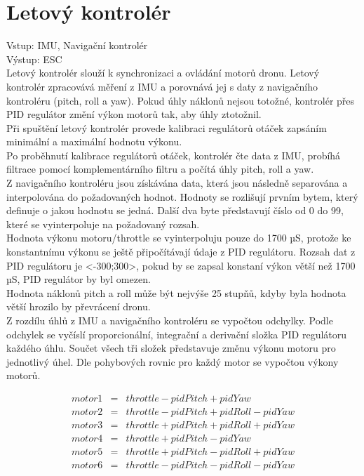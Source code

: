 \section{Letový kontrolér} 
Vstup: IMU, Navigační kontrolér\\
Výstup: ESC\\

Letový kontrolér slouží k synchronizaci a ovládání motorů dronu. Letový kontrolér zpracovává měření z IMU a porovnává jej s daty z navigačního kontroléru (pitch, roll a yaw). Pokud úhly náklonů nejsou totožné, kontrolér přes PID regulátor změní výkon motorů tak, aby úhly ztotožnil.\\
Při spuštění letový kontrolér provede kalibraci regulátorů otáček zapsáním minimální a maximální hodnotu výkonu.\\
Po proběhnutí kalibrace regulátorů otáček, kontrolér čte data z IMU, probíhá filtrace pomocí komplementárního filtru a počítá úhly pitch, roll a yaw.\\
Z navigačního kontroléru jsou získávána data, která jsou následně separována a interpolována do požadovaných hodnot. Hodnoty se rozlišují prvním bytem, který definuje o jakou hodnotu se jedná. Další dva byte představují číslo od 0 do 99, které se vyinterpoluje na požadovaný rozsah.\\
Hodnota výkonu motoru/throttle se vyinterpoluju pouze do 1700 µS, protože ke konstantnímu výkonu se ještě připočítávají údaje z PID regulátoru. Rozsah dat z PID regulátoru je <-300;300>, pokud by se zapsal konstaní výkon větší než 1700 µS, PID regulátor by byl omezen.\\
Hodnota náklonů pitch a roll  může být nejvýše 25 stupňů, kdyby byla hodnota větší hrozilo by převrácení dronu.\\
Z rozdílu úhlů z IMU a navigačního kontroléru se vypočtou odchylky. Podle odchylek se vyčíslí proporcionální, integrační a derivační složka PID regulátoru každého úhlu. Součet všech tři složek představuje změnu výkonu motoru pro jednotlivý úhel. Dle pohybových rovnic pro každý motor se vypočtou výkony motorů.

\begin{eqnarray*} 
	motor1 & = & throttle - pidPitch           + pidYaw\\
	motor2 & = & throttle - pidPitch + pidRoll - pidYaw\\
	motor3 & = & throttle + pidPitch + pidRoll + pidYaw\\
	motor4 & = & throttle + pidPitch           - pidYaw\\
	motor5 & = & throttle + pidPitch - pidRoll + pidYaw\\
	motor6 & = & throttle - pidPitch - pidRoll - pidYaw\\
\end{eqnarray*} 


